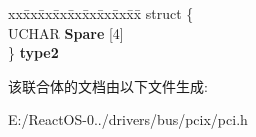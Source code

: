 \begin{DoxyCompactItemize}
\begin{tabbing}
\end{tabbing}\item 
\mbox{\label{union___p_c_i___h_e_a_d_e_r___t_y_p_e___d_e_p_e_n_d_e_n_t_aa920dd5af0d2ccd5d17856ec79ee9c5d}} 
\begin{tabbing}
xx\=xx\=xx\=xx\=xx\=xx\=xx\=xx\=xx\=\kill
struct \{\\
\>UCHAR {\bfseries Spare} \mbox{[}4\mbox{]}\\
\} {\bfseries type2}\\

\end{tabbing}\end{DoxyCompactItemize}


该联合体的文档由以下文件生成\+:\begin{DoxyCompactItemize}
\item 
E\+:/\+React\+O\+S-\/0../drivers/bus/pcix/pci.\+h\end{DoxyCompactItemize}
